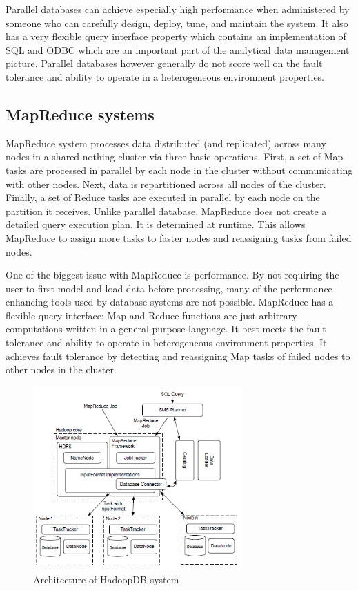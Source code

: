 \documentclass[9pt,twocolumn,twoside]{styles/osajnl}
\begin{document}
Parallel databases can achieve especially high performance when administered by someone who can carefully design, deploy, tune, and maintain the system. It also has a very flexible query interface property which contains an implementation of SQL and ODBC which are an important part of the analytical data management picture. Parallel databases however generally do not score well on the fault tolerance and ability to operate in a heterogeneous environment properties. 
    
\subsection{MapReduce systems}
MapReduce system processes data distributed (and replicated) across many nodes in a shared-nothing cluster via three basic operations. First, a set of Map tasks are processed in parallel by each node in the cluster without communicating with other nodes. Next, data is repartitioned across all nodes of the cluster. Finally, a set of Reduce tasks are executed in parallel by each node on the partition it receives. Unlike parallel database, MapReduce does not create a detailed query execution plan. It is determined at runtime. This allows MapReduce to assign more tasks to faster nodes and reassigning tasks from failed nodes. 

One of the biggest issue with MapReduce is performance. By not requiring the user to first model and load data before processing, many of the performance enhancing tools used by database systems are not possible. MapReduce has a flexible query interface; Map and Reduce functions are just arbitrary computations written in a general-purpose language. It best meets the fault tolerance and ability to operate in heterogeneous environment properties. It achieves fault tolerance by detecting and reassigning Map tasks of failed nodes to other
nodes in the cluster.

\begin{figure}[h]
    \centering
    \includegraphics[width=8cm]{images/hadoopDB.png}
    \caption{Architecture of HadoopDB system}
\end{figure}
\end{document}
